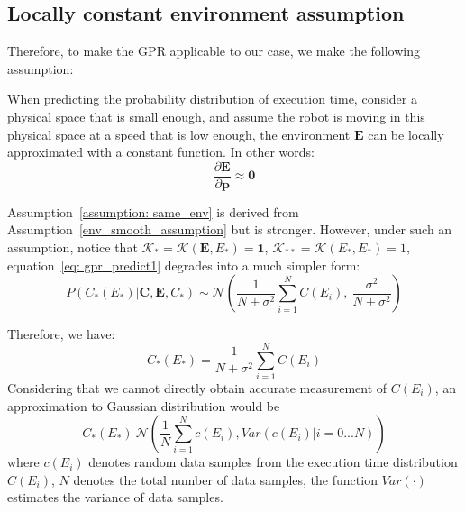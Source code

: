     \subsection{Locally constant environment assumption}
    Therefore, to make the GPR applicable to our case, we make the following assumption:
    \begin{assumption}
    \label{assumption: same_env}
        When predicting the probability distribution of execution time, consider a physical space that is small enough, and assume the robot is moving in this physical space at a speed that is low enough, the environment $\textbf{E}$ can be locally approximated with a constant function. In other words:
        \begin{equation}
        \label{eq: same_e_over_p}
            \frac{\partial \textbf{E}}{\partial \textbf{p}} \approx \textbf{0}
        \end{equation}
    \end{assumption}


    Assumption~\ref{assumption: same_env} is derived from Assumption~\ref{env_smooth_assumption} but is stronger. 
    However, under such an assumption, notice that $\bm{\mathcal{K}}_* = \mathcal{K}(\bm{E}, E_* ) = \textbf{1}$, $ \bm{\mathcal{K}}_{**}=\mathcal{K}(E_*, E_*)=1$, equation~\eqref{eq: gpr_predict1} degrades into a much simpler form:
	\begin{equation}
	P(C_{*}(E_*) | \textbf{C}, \textbf{E}, C_{*}) \sim \mathcal{N}(\frac{1}{N+\sigma^2}\sum_{i=1}^N C(E_i), \ \frac{\sigma^2}{N+\sigma^2})
        \label{eq: gpr_predict_constant_env}
	\end{equation}

    Therefore, we have:
    \begin{equation}
        C_{*}(E_*) = \frac{1}{N+\sigma^2}\sum_{i=1}^N C(E_i)
    \end{equation}
    Considering that we cannot directly obtain accurate measurement of $C(E_i)$, an approximation to Gaussian distribution would be
    \begin{equation}
        C_{*}(E_*) ~ \mathcal{N}(\frac{1}{N}\sum_{i=1}^N c(E_i), \textit{Var}(c(E_i) | i=0...N) )
        \label{eq: estiamte_execution_time_distribution}
    \end{equation}
    where $c(E_i)$ denotes random data samples from the execution time distribution $C(E_i)$, $N$ denotes the total number of data samples, the function $\textit{Var}(\cdot)$ estimates the variance of data samples.

